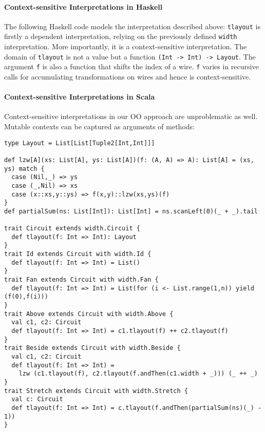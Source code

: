 \paragraph{Context-sensitive Interpretations in Haskell}
The following Haskell code models the interpretation described above:
\lstinline{tlayout} is firstly a dependent interpretation, relying on the
previously defined \lstinline{width} interpretation.
More importantly, it is a context-sensitive interpretation.
The domain of \lstinline{tlayout} is not a value but a function \lstinline{(Int -> Int) -> Layout}.
The argument \lstinline{f} is also a function that shifts the index of a wire.
\lstinline{f} varies in recursive calls for accumulating transformations
on wires and hence is context-sensitive.

\paragraph{Context-sensitive Interpretations in Scala}
Context-sensitive interpretations in our OO approach are unproblematic as well.
Mutable contexts can be captured as arguments of methods:
\begin{lstlisting}
type Layout = List[List[Tuple2[Int,Int]]]

def lzw[A](xs: List[A], ys: List[A])(f: (A, A) => A): List[A] = (xs, ys) match {
  case (Nil,_) => ys
  case (_,Nil) => xs
  case (x::xs,y::ys) => f(x,y)::lzw(xs,ys)(f)
}
def partialSum(ns: List[Int]): List[Int] = ns.scanLeft(0)(_ + _).tail

trait Circuit extends width.Circuit {
  def tlayout(f: Int => Int): Layout
}
trait Id extends Circuit with width.Id {
  def tlayout(f: Int => Int) = List()
}
trait Fan extends Circuit with width.Fan {
  def tlayout(f: Int => Int) = List(for (i <- List.range(1,n)) yield (f(0),f(i)))
}
trait Above extends Circuit with width.Above {
  val c1, c2: Circuit
  def tlayout(f: Int => Int) = c1.tlayout(f) ++ c2.tlayout(f)
}
trait Beside extends Circuit with width.Beside {
  val c1, c2: Circuit
  def tlayout(f: Int => Int) =
    lzw (c1.tlayout(f), c2.tlayout(f.andThen(c1.width + _))) (_ ++ _)
}
trait Stretch extends Circuit with width.Stretch {
  val c: Circuit
  def tlayout(f: Int => Int) = c.tlayout(f.andThen(partialSum(ns)(_) - 1))
}
\end{lstlisting}

